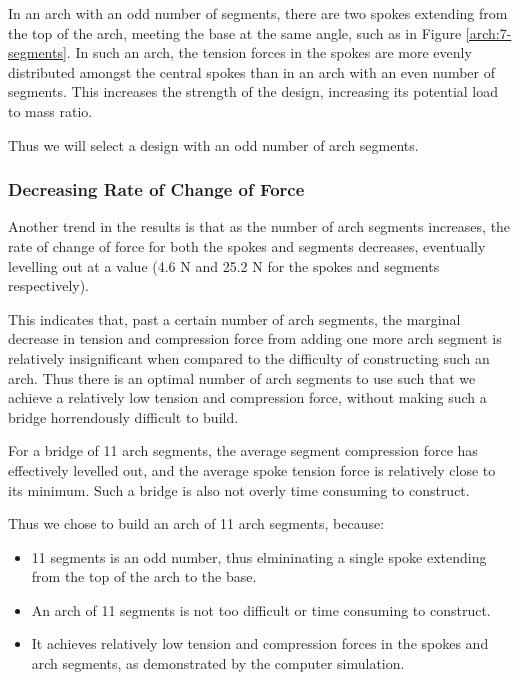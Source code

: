 \documentclass[a4paper,11pt]{article}
\begin{document}
In an arch with an odd number of segments, there are two spokes extending from
the top of the arch, meeting the base at the same angle, such as in Figure
\ref{arch:7-segments}.
In such an arch, the tension forces in the spokes are more evenly distributed
amongst the central spokes than in an arch with an even number of segments.
This increases the strength of the design, increasing its potential load to mass
ratio.

Thus we will select a design with an odd number of arch segments.


\subsubsection{Decreasing Rate of Change of Force}

Another trend in the results is that as the number of arch segments increases,
the rate of change of force for both the spokes and segments decreases,
eventually levelling out at a value (4.6 N and 25.2 N for the spokes and
segments respectively).

This indicates that, past a certain number of arch segments, the marginal
decrease in tension and compression force from adding one more arch segment is
relatively insignificant when compared to the difficulty of constructing such an
arch. Thus there is an optimal number of arch segments to use such that we
achieve a relatively low tension and compression force, without making such a
bridge horrendously difficult to build.

For a bridge of 11 arch segments, the average segment compression
force has effectively levelled out, and the average spoke tension force is
relatively close to its minimum.
Such a bridge is also not overly time consuming to construct.

Thus we chose to build an arch of 11 arch segments, because:

\begin{itemize}
\item 11 segments is an odd number, thus elmininating a single spoke extending
	from the top of the arch to the base.
\item An arch of 11 segments is not too difficult or time consuming to
	construct.
\item It achieves relatively low tension and compression forces in the spokes
	and arch segments, as demonstrated by the computer simulation.
\end{itemize}
\end{document}
